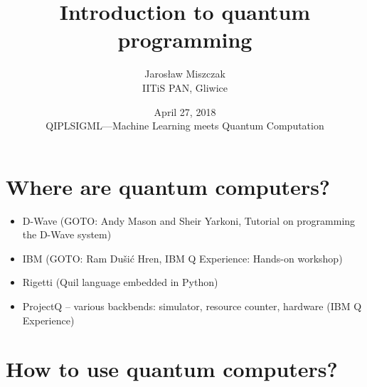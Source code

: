 \documentclass{beamer}
\title{Introduction to quantum programming}
\author{Jaros\l aw Miszczak\\ IITiS PAN, Gliwice}
\date{April 27, 2018\\ QIPLSIGML---Machine Learning meets Quantum Computation}
\begin{document}
\begin{frame}{}
   \maketitle 
\end{frame}

\begin{frame}{}
    \tableofcontents
\end{frame}




\section{Where are quantum computers?}

\begin{frame}{\insertsection}
    \begin{itemize}
        \item D-Wave (GOTO: Andy Mason and Sheir Yarkoni, Tutorial on 
        programming the D-Wave system) 
        \item IBM (GOTO: Ram Du\v{s}i\'c Hren, IBM Q Experience: Hands-on 
        workshop)
        \item Rigetti (Quil language embedded in Python)
        \item ProjectQ -- various backbends: simulator, resource counter, 
        hardware (IBM Q Experience)
    \end{itemize}
\end{frame}

\section{How to use quantum computers?}
\end{document}
